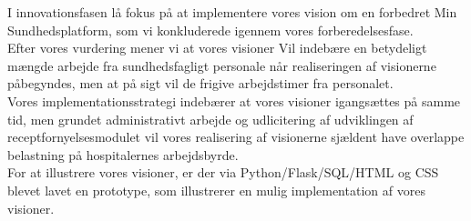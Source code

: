 I innovationsfasen lå fokus på at implementere vores vision om en forbedret Min Sundhedsplatform, som vi konkluderede igennem vores forberedelsesfase.\\
Efter vores vurdering mener vi at vores visioner Vil indebære en betydeligt mængde arbejde fra sundhedsfagligt personale når realiseringen af visionerne påbegyndes, men at på sigt vil de frigive arbejdstimer fra personalet.\\
Vores implementationsstrategi indebærer at vores visioner igangsættes på samme tid, men grundet administrativt arbejde og udlicitering af udviklingen af receptfornyelsesmodulet vil vores realisering af visionerne sjældent have overlappe belastning på hospitalernes arbejdsbyrde.\\
For at illustrere vores visioner, er der via Python/Flask/SQL/HTML og CSS blevet lavet en prototype, som illustrerer en mulig implementation af vores visioner.\\